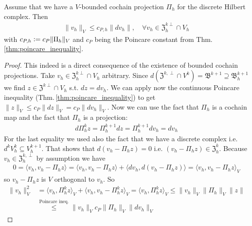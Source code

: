 \documentclass[../master_thesis.tex]{subfiles}
\begin{document}
\begin{proposition}
    Assume that we have a $V$-bounded cochain projection $\Pi_h$ for 
    the discrete Hilbert complex. Then 
    \begin{align*}
        \lVert v_h \rVert _V \leq c_{P,h}  \lVert dv_h \rVert, 
            \quad \forall v_h \in \mathfrak{Z}_h^{k\perp}\cap V_h
    \end{align*}
    with $c_{P,h} \vcentcolon= c_{P} \lVert \Pi_h \rVert _V$  and $c_P$ being the Poincare constant from 
    Thm.\,\ref{thm:poincare_inequality}.
\end{proposition}
\begin{proof}
    This indeed is a direct consequence of the existence of bounded cochain projections.
    Take $v_h \in \mathfrak{Z}_h^{k\perp}\cap V_h$ arbitrary. 
    Since $d (\mathfrak{Z}^{k,\perp} \cap V^k) = \mathfrak{B}^{k+1} \supseteq \mathfrak{B}^{k+1}_h$ we find 
    $z\in \mathfrak{Z}^{k\perp}\cap V_h$ s.t. $dz = dv_h$. We can apply now the continuous 
    Poincare inequality (Thm.\,\ref{thm:poincare_inequality}) to get $\lVert z \rVert _V \leq c_P \lVert dz \rVert _V = c_P \lVert dv_h \rVert _V$.
    Now we can use the fact that $\Pi_h$ is a cochain map 
    and the fact that $\Pi_h$ is a projection:
    \begin{align*}
        d\Pi^k_h z = \Pi^{k+1}_h dz = \Pi^{k+1}_h dv_h = dv_h
    \end{align*}
    For the last equality we used also the fact that we have a discrete complex i.e. $d^k V^k_h \subseteq V^{k+1}_h$.
    That shows that $d(v_h - \Pi_h z) = 0$ i.e. $(v_h - \Pi_h z) \in \mathfrak{Z}_h^k$.
    Because $v_h \in \mathfrak{Z}_h^{k,\perp}$ by assumption we have 
    \begin{align*}
        0 = \langle v_h, v_h - \Pi_h z \rangle = \langle v_h, v_h - \Pi_h z \rangle + \langle dv_h, d(v_h - \Pi_h z) \rangle
            = \langle v_h, v_h - \Pi_h z \rangle _V
    \end{align*}
    so $v_h - \Pi_h z$ is $V$ orthogonal to $v_h$. So 
    \begin{align*}
        \lVert v_h \rVert _V^2 &= \langle v_h, \Pi_h^k z \rangle _V + \langle v_h, v_h - \Pi_h^k z\rangle _V 
        = \langle v_h, \Pi_h^k z \rangle _V \leq \lVert v_h \rVert _V \lVert \Pi_h \rVert _V \lVert z \rVert 
        \\ &\stackrel{\text{Poincare ineq.}}{\leq} \lVert v_h \rVert _V c_P \lVert \Pi_h \rVert _V 
            \lVert dv_h \rVert _V
    \end{align*}
\end{proof}
\end{document}
